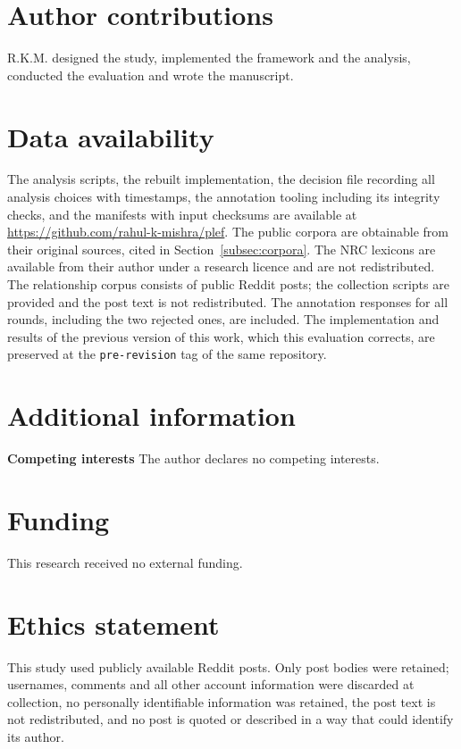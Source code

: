 \documentclass[fleqn,10pt]{wlscirep}
\begin{document}
\section*{Author contributions}

R.K.M. designed the study, implemented the framework and the analysis, conducted
the evaluation and wrote the manuscript.

\section*{Data availability}

The analysis scripts, the rebuilt implementation, the decision file recording all
analysis choices with timestamps, the annotation tooling including its integrity
checks, and the manifests with input checksums are available at
\url{https://github.com/rahul-k-mishra/plef}. The public corpora are obtainable
from their original sources, cited in Section~\ref{subsec:corpora}. The NRC
lexicons are available from their author under a research licence and are not
redistributed. The relationship corpus consists of public Reddit posts; the
collection scripts are provided and the post text is not redistributed. The
annotation responses for all rounds, including the two rejected ones, are
included. The implementation and results of the previous version of this work, which this
evaluation corrects, are preserved at the \texttt{pre-revision} tag of the same
repository.

\section*{Additional information}

\textbf{Competing interests} The author declares no competing interests.

\section*{Funding}

This research received no external funding.

\section*{Ethics statement}

This study used publicly available Reddit posts. Only post bodies were
retained; usernames, comments and all other account information were discarded
at collection, no personally identifiable information was retained, the post
text is not redistributed, and no post is quoted or described in a way that
could identify its author.
\end{document}
